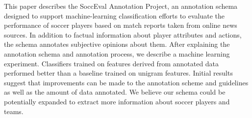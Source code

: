 This paper describes the SoccEval Annotation Project, an annotation schema designed to support machine-learning classification efforts to evaluate the performance of soccer players based on match reports taken from online news sources. In addition to factual information about player attributes and actions, the schema annotates subjective opinions about them. After explaining the annotation schema and annotation process, we describe a machine learning experiment. Classifiers trained on features derived from annotated data performed better than a baseline trained on unigram features. Initial results suggest that improvements can be made to the annotation scheme and guidelines as well as the amount of data annotated. We believe our schema could be potentially expanded to extract more information about soccer players and teams.
